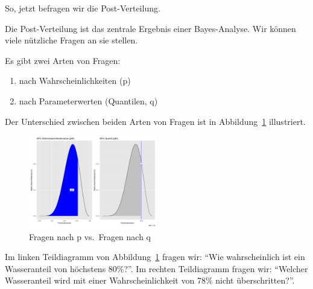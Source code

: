 \documentclass[
  a4paper,
  DIV=11]{scrreprt}
\providecommand{\tightlist}{%
  \setlength{\itemsep}{0pt}\setlength{\parskip}{0pt}}\usepackage{longtable,booktabs,array}
\theoremstyle{definition}
\theoremstyle{remark}
\begin{document}
So, jetzt befragen wir die Post-Verteilung.

\begin{tcolorbox}[enhanced jigsaw, leftrule=.75mm, toptitle=1mm, bottomtitle=1mm, titlerule=0mm, breakable, colframe=quarto-callout-important-color-frame, title=\textcolor{quarto-callout-important-color}{\faExclamation}\hspace{0.5em}{Wichtig}, rightrule=.15mm, colback=white, arc=.35mm, left=2mm, bottomrule=.15mm, coltitle=black, opacitybacktitle=0.6, toprule=.15mm, colbacktitle=quarto-callout-important-color!10!white, opacityback=0]
Die Post-Verteilung ist das zentrale Ergebnis einer Bayes-Analyse. Wir
können viele nützliche Fragen an sie stellen.
\end{tcolorbox}

Es gibt zwei Arten von Fragen:

\begin{enumerate}
\def\labelenumi{\arabic{enumi}.}
\tightlist
\item
  nach Wahrscheinlichkeiten (p)
\item
  nach Parameterwerten (Quantilen, q)
\end{enumerate}

Der Unterschied zwischen beiden Arten von Fragen ist in
Abbildung~\ref{fig-p-vs-q} illustriert.

\begin{figure}

{\centering \includegraphics[width=0.5\textwidth,height=\textheight]{./img/p-vs-q.png}

}

\caption{\label{fig-p-vs-q}Fragen nach p vs.~Fragen nach q}

\end{figure}

Im linken Teildiagramm von Abbildung~\ref{fig-p-vs-q} fragen wir: ``Wie
wahrscheinlich ist ein Wasseranteil von höchstens 80\%?''. Im rechten
Teildiagramm fragen wir: ``Welcher Wasseranteil wird mit einer
Wahrscheinlichkeit von 78\% nicht überschritten?''.
\end{document}
